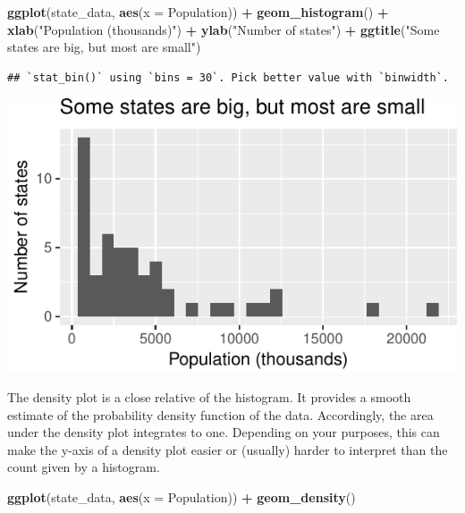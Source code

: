 \documentclass[12pt,oneside,openany]{book}
\newenvironment{Shaded}{\begin{snugshade}}{\end{snugshade}}
\newcommand{\KeywordTok}[1]{\textcolor[rgb]{0.13,0.29,0.53}{\textbf{#1}}}
\newcommand{\DataTypeTok}[1]{\textcolor[rgb]{0.13,0.29,0.53}{#1}}
\newcommand{\StringTok}[1]{\textcolor[rgb]{0.31,0.60,0.02}{#1}}
\newcommand{\OperatorTok}[1]{\textcolor[rgb]{0.81,0.36,0.00}{\textbf{#1}}}
\newcommand{\NormalTok}[1]{#1}
\begin{document}
\begin{Shaded}
\begin{Highlighting}[]
\KeywordTok{ggplot}\NormalTok{(state_data, }\KeywordTok{aes}\NormalTok{(}\DataTypeTok{x =}\NormalTok{ Population)) }\OperatorTok{+}
\StringTok{  }\KeywordTok{geom_histogram}\NormalTok{() }\OperatorTok{+}
\StringTok{  }\KeywordTok{xlab}\NormalTok{(}\StringTok{"Population (thousands)"}\NormalTok{) }\OperatorTok{+}
\StringTok{  }\KeywordTok{ylab}\NormalTok{(}\StringTok{"Number of states"}\NormalTok{) }\OperatorTok{+}
\StringTok{  }\KeywordTok{ggtitle}\NormalTok{(}\StringTok{"Some states are big, but most are small"}\NormalTok{)}
\end{Highlighting}
\end{Shaded}

\begin{verbatim}
## `stat_bin()` using `bins = 30`. Pick better value with `binwidth`.
\end{verbatim}

\includegraphics{pdaps_files/figure-latex/axis-labeling-1.pdf}

The density plot is a close relative of the histogram. It provides a
smooth estimate of the probability density function of the data.
Accordingly, the area under the density plot integrates to one.
Depending on your purposes, this can make the y-axis of a density plot
easier or (usually) harder to interpret than the count given by a
histogram.

\begin{Shaded}
\begin{Highlighting}[]
\KeywordTok{ggplot}\NormalTok{(state_data, }\KeywordTok{aes}\NormalTok{(}\DataTypeTok{x =}\NormalTok{ Population)) }\OperatorTok{+}
\StringTok{  }\KeywordTok{geom_density}\NormalTok{()}
\end{Highlighting}
\end{Shaded}
\end{document}
